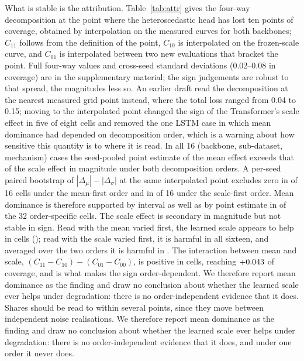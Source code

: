 \documentclass[journal]{IEEEtran}
\begin{document}
What is stable is the attribution. Table~\ref{tab:attr} gives the four-way decomposition at the point where the heteroscedastic head has lost ten points of coverage, obtained by interpolation on the measured curves for both backbones; $C_{11}$ follows from the definition of the point, $C_{10}$ is interpolated on the frozen-scale curve, and $C_{01}$ is interpolated between two new evaluations that bracket the point. Full four-way values and cross-seed standard deviations (0.02--0.08 in coverage) are in the supplementary material; the sign judgements are robust to that spread, the magnitudes less so. An earlier draft read the decomposition at the nearest measured grid point instead, where the total loss ranged from 0.04 to 0.15; moving to the interpolated point changed the sign of the Transformer's scale effect in five of eight cells and removed the one LSTM case in which mean dominance had depended on decomposition order, which is a warning about how sensitive this quantity is to where it is read. In all 16 (backbone, sub-dataset, mechanism) cases the seed-pooled point estimate of the mean effect exceeds that of the scale effect in magnitude under both decomposition orders. A per-seed paired bootstrap of $|\Delta_\mu|-|\Delta_\sigma|$ at the same interpolated point excludes zero in \NCIA{} of 16 cells under the mean-first order and in \NCIB{} of 16 under the scale-first order. Mean dominance is therefore supported by interval as well as by point estimate in \NCITot{} of the 32 order-specific cells. The scale effect is secondary in magnitude but not stable in sign. Read with the mean varied first, the learned scale appears to help in \NHelpA{} cells (\NHelpAList); read with the scale varied first, it is harmful in all sixteen, and averaged over the two orders it is harmful in \NAvgHarm. The interaction between mean and scale, $(C_{11}-C_{10})-(C_{01}-C_{00})$, is positive in \NInterPos{} cells, reaching $+0.043$ of coverage, and is what makes the sign order-dependent. We therefore report mean dominance as the finding and draw no conclusion about whether the learned scale ever helps under degradation: there is no order-independent evidence that it does. Shares should be read to within several points, since they move between independent noise realisations. We therefore report mean dominance as the finding and draw no conclusion about whether the learned scale ever helps under degradation: there is no order-independent evidence that it does, and under one order it never does.
\end{document}
